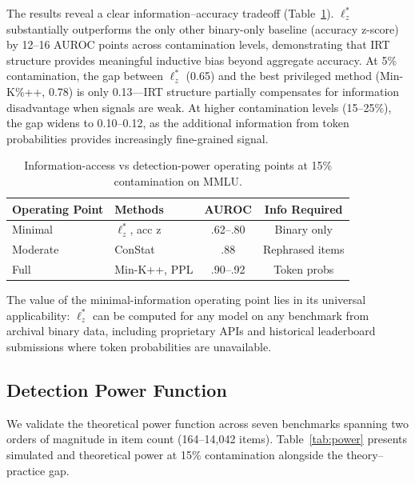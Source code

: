 \documentclass[11pt,a4paper]{article}
\begin{document}
The results reveal a clear information--accuracy tradeoff (Table~\ref{tab:info-access}).
$\ell_z^*$ substantially outperforms the only other binary-only baseline (accuracy z-score) by 12--16 AUROC points across contamination levels, demonstrating that IRT structure provides meaningful inductive bias beyond aggregate accuracy.
At 5\% contamination, the gap between $\ell_z^*$ (0.65) and the best privileged method (Min-K\%++, 0.78) is only 0.13---IRT structure partially compensates for information disadvantage when signals are weak.
At higher contamination levels (15--25\%), the gap widens to 0.10--0.12, as the additional information from token probabilities provides increasingly fine-grained signal.

\begin{table}[t]
\centering
\caption{Information-access vs detection-power operating points at 15\% contamination on MMLU.}
\label{tab:info-access}
\small
\begin{tabular}{llcc}
\toprule
Operating Point & Methods & AUROC & Info Required \\
\midrule
Minimal & $\ell_z^*$, acc z & .62--.80 & Binary only \\
Moderate & ConStat & .88 & Rephrased items \\
Full & Min-K++, PPL & .90--.92 & Token probs \\
\bottomrule
\end{tabular}
\end{table}

The value of the minimal-information operating point lies in its universal applicability: $\ell_z^*$ can be computed for any model on any benchmark from archival binary data, including proprietary APIs and historical leaderboard submissions where token probabilities are unavailable.

\subsection{Detection Power Function}
\label{sec:power}

We validate the theoretical power function across seven benchmarks spanning two orders of magnitude in item count (164--14,042 items).
Table~\ref{tab:power} presents simulated and theoretical power at 15\% contamination alongside the theory--practice gap.
\end{document}

